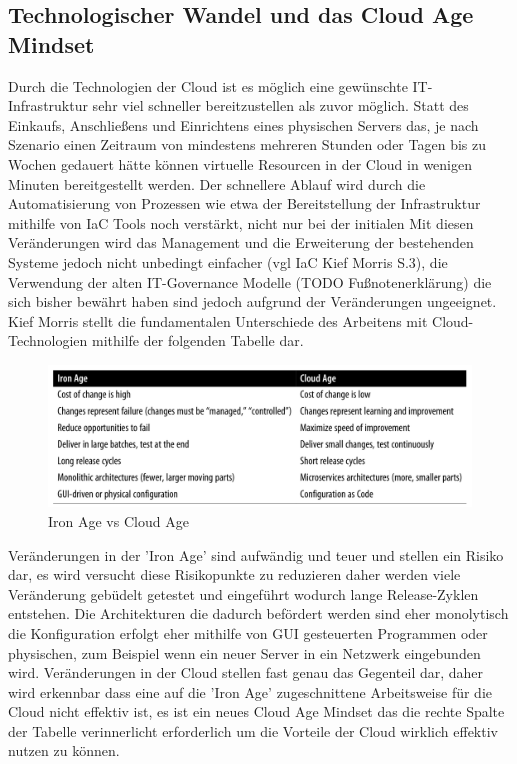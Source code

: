 \begin{spacing}{1.2}
\subsection{Technologischer Wandel und das Cloud Age Mindset}

Durch die Technologien der Cloud ist es möglich eine gewünschte
IT-Infrastruktur sehr viel schneller bereitzustellen als
zuvor möglich. Statt des Einkaufs, Anschließens und Einrichtens eines
physischen Servers das, je nach Szenario einen Zeitraum von mindestens
mehreren Stunden oder Tagen bis zu Wochen gedauert hätte können
virtuelle Resourcen in der Cloud in wenigen Minuten bereitgestellt werden.
Der schnellere Ablauf wird durch die Automatisierung von Prozessen wie etwa
der Bereitstellung der Infrastruktur mithilfe von IaC Tools noch verstärkt,
nicht nur bei der initialen 
Mit diesen Veränderungen wird das Management und die Erweiterung der
bestehenden Systeme jedoch nicht unbedingt einfacher (vgl IaC Kief Morris S.3),
die Verwendung der alten IT-Governance Modelle (TODO Fußnotenerklärung) die
sich bisher bewährt haben sind jedoch aufgrund der Veränderungen ungeeignet.
Kief Morris stellt die fundamentalen Unterschiede des Arbeitens mit
Cloud-Technologien mithilfe der folgenden Tabelle dar.

\begin{figure}[H]
  \includegraphics[width=1.0\textwidth]{fig/hauptteil/Tabelle_1-2_IaC.png}
  \caption{Iron Age vs Cloud Age}
  \centering
\end{figure}

Veränderungen in der 'Iron Age' sind aufwändig und teuer und stellen ein
Risiko dar, es wird versucht diese Risikopunkte zu reduzieren daher werden
viele Veränderung gebüdelt getestet und eingeführt wodurch lange
Release-Zyklen entstehen. Die Architekturen die dadurch befördert werden
sind eher monolytisch die Konfiguration erfolgt eher mithilfe von GUI
gesteuerten Programmen oder physischen, zum Beispiel wenn ein neuer Server
in ein Netzwerk eingebunden wird. Veränderungen in der Cloud stellen
fast genau das Gegenteil dar, daher wird erkennbar dass eine auf die
'Iron Age' zugeschnittene Arbeitsweise für die Cloud nicht effektiv ist,
es ist ein neues Cloud Age Mindset das die rechte Spalte der Tabelle
verinnerlicht erforderlich um die Vorteile der Cloud
wirklich effektiv nutzen zu können.


\end{spacing}

